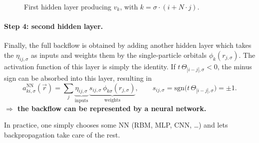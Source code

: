 \documentclass[../../main.tex]{subfiles}
\begin{document}
\begin{figure}[ht]
\centering
{}
\caption{First hidden layer producing $v_k$, with $k=\sigma\cdot(i+N\cdot j)$.}
\label{fig:sketch_nn_first_layer}
\end{figure}

\paragraph{Step 4: second hidden layer.}
Finally, the full backflow is obtained by adding another hidden layer which takes
the $\eta_{ij,\sigma}$ as inputs and weights them by the single-particle orbitals
$\phi_k(r_{j,\sigma})$. The activation function of this layer is simply the
identity. If $t\,\Theta_{|i-j|,\sigma}<0$, the minus sign can be absorbed into
this layer, resulting in
\begin{equation}
a^{\mathrm{NN}}_{k i,\sigma}(\vec r)=\sum_j
\underbrace{\eta_{ij,\sigma}}_{\text{inputs}}\,
\underbrace{s_{ij,\sigma}\,\phi_{k\sigma}(r_{j,\sigma})}_{\text{weights}},
\qquad
s_{ij,\sigma}=\mathrm{sgn}\big(t\,\Theta_{|i-j|,\sigma}\big)=\pm1 .
\end{equation}
\textbf{$\Rightarrow$ the backflow can be represented by a neural network.}

In practice, one simply chooses some NN (RBM, MLP, CNN, \dots) and lets
backpropagation take care of the rest.
\end{document}
